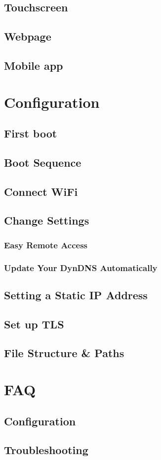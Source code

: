 \documentclass{article}
\begin{document}
\subsection{Touchscreen} \label{Touchscreen}

\subsection{Webpage} \label{Webpage}

\subsection{Mobile app}


\section{Configuration}
\subsection{First boot}

\subsection{Boot Sequence}

\subsection{Connect WiFi}

\subsection{Change Settings}
\subsubsection{Easy Remote Access}

\subsubsection{Update Your DynDNS Automatically}

\subsection{Setting a Static IP Address} \label{Static IP}

\subsection{Set up TLS} \label{Set up TLS}


\subsection{File Structure \& Paths}



\section{FAQ}
\subsection{Configuration}


\subsection{Troubleshooting}

\end{document}
